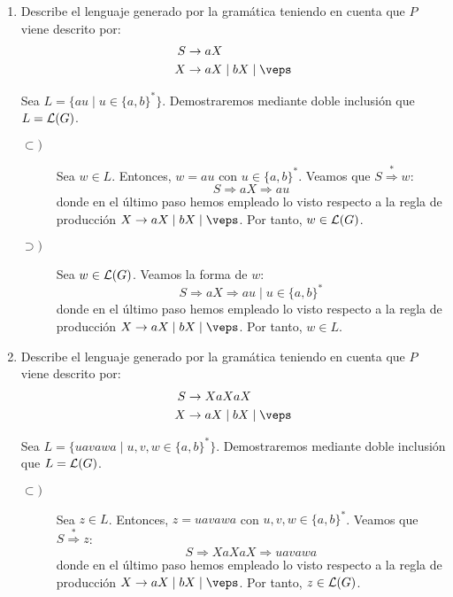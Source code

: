 \begin{ejercicio}
\begin{enumerate}
        \item Describe el lenguaje generado por la gramática teniendo en cuenta que $P$ viene descrito por:
        \begin{align*}
            S &\rightarrow aX \\
            X &\rightarrow aX \mid bX \mid \veps
        \end{align*}

        Sea $L=\{au \mid u\in\{a,b\}^\ast\}$. Demostraremos mediante doble inclusión que $L=\mathcal{L}(G)$.
        \begin{description}
            \item[$\subset)$] Sea $w\in L$. Entonces, $w=au$ con $u\in\{a,b\}^\ast$. Veamos que
            $S \stackrel{\ast}{\Longrightarrow} w$:
            \begin{equation*}
                S \Longrightarrow aX \Longrightarrow au
            \end{equation*}
            donde en el último paso hemos empleado lo visto respecto a la regla de producción $X\rightarrow aX \mid bX \mid \veps$. Por tanto, $w\in \mathcal{L}(G)$.

            \item[$\supset)$] Sea $w\in\mathcal{L}(G)$. Veamos la forma de $w$:
            \begin{equation*}
                S \Longrightarrow aX \Longrightarrow au \mid u\in\{a,b\}^\ast
            \end{equation*}
            donde en el último paso hemos empleado lo visto respecto a la regla de producción $X\rightarrow aX \mid bX \mid \veps$. Por tanto, $w\in L$.
        \end{description}

        \item Describe el lenguaje generado por la gramática teniendo en cuenta que $P$ viene descrito por:
        \begin{align*}
            S &\rightarrow XaXaX \\
            X &\rightarrow aX \mid bX \mid \veps
        \end{align*}

        Sea $L=\{uavawa \mid u,v,w\in\{a,b\}^\ast\}$. Demostraremos mediante doble inclusión que $L=\mathcal{L}(G)$.
        \begin{description}
            \item[$\subset)$] Sea $z\in L$. Entonces, $z=uavawa$ con $u,v,w\in\{a,b\}^\ast$. Veamos que
            $S \stackrel{\ast}{\Longrightarrow} z$:
            \begin{equation*}
                S \Longrightarrow XaXaX \Longrightarrow uavawa
            \end{equation*}
            donde en el último paso hemos empleado lo visto respecto a la regla de producción $X\rightarrow aX \mid bX \mid \veps$. Por tanto, $z\in \mathcal{L}(G)$.


\end{description}
\end{enumerate}
\end{ejercicio}
